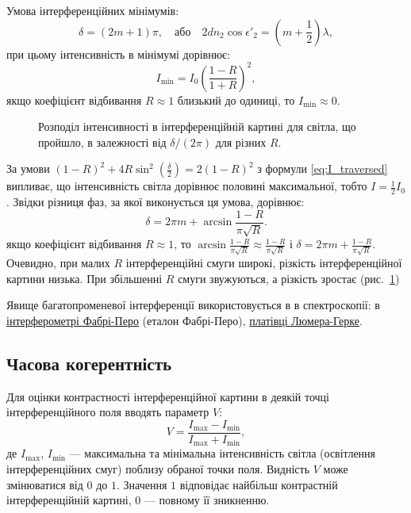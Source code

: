 Умова інтерференційних мінімумів:
\begin{equation}\label{}
	\delta = (2m+1)\pi,\quad \text{або}\quad 2 dn_2\cos\epsilon'_2 = \left(m + \frac12\right)\lambda,
\end{equation}
при цьому інтенсивність в мінімумі дорівнює:
\begin{equation}\label{eq:manyrays_I}
	I_{\min} = I_0 \left( \frac{1-R}{1+R} \right)^2,
\end{equation}
якщо коефіцієнт відбивання $R \approx 1$ близький до одиниці, то $ I_{\min} \approx 0$.

\begin{figure}[htbp!]\centering
	
	\caption{Розподіл інтенсивності в інтерференційній картині для світла, що пройшло, в залежності від $\delta/(2\pi)$ для різних $R$.}
	\label{pic:plot_manyrays}
\end{figure}

За умови $(1-R)^2 + 4R\sin^2\left( \frac\delta2\right)  = 2(1-R)^2$ з формули \eqref{eq:I_traversed} випливає, що інтенсивність світла дорівнює половині максимальної, тобто $I = \frac12 I_0$. Звідки різниця фаз, за якої виконується ця умова, дорівнює:
\begin{equation}\label{eq:manyrays_I_ddelta}
	\delta = 2\pi m + \arcsin\frac{1-R}{\pi\sqrt{R}}.
\end{equation}
якщо коефіцієнт відбивання $R \approx 1$, то $\arcsin\frac{1-R}{\pi\sqrt{R}} \approx \frac{1-R}{\pi\sqrt{R}} $ і $\delta = 2\pi m + \frac{1-R}{\pi\sqrt{R}}$.
Очевидно, при малих $ R $ інтерференційні смуги широкі, різкість інтерференційної картини низька. При збільшенні $ R $ смуги звужуються, а різкість зростає (рис.~\ref{pic:plot_manyrays})

Явище багатопроменевої інтерференції використовується в
в спектроскопії: в \href{https://www.youtube.com/watch?v=BT675FhuvuA\&ab_channel=toc1955}{інтерферометрі Фабрі-Перо} (еталон Фабрі-Перо), \href{https://uk.upwiki.one/wiki/Lummer%E2%80%93Gehrcke_interferometer}{платівці Люмера-Герке}.




\subsection*{Часова когерентність}


Для оцінки контрастності
інтерференційної картини в деякій точці інтерференційного
поля вводять параметр  $V$:
\begin{equation}\label{eq:vis_par}
	V = \frac{I_{\max} - I_{\min}}{I_{\max} + I_{\min}},
\end{equation}
де $I_{\max}$, $I_{\min}$ --- максимальна та мінімальна інтенсивність світла
(освітлення інтерференційних смуг) поблизу обраної точки
поля. Видність $V$ може змінюватися від $0$ до $1$. Значення $1$
відповідає найбільш контрастній інтерференційній картині,
$0$ --- повному її зникненню.

